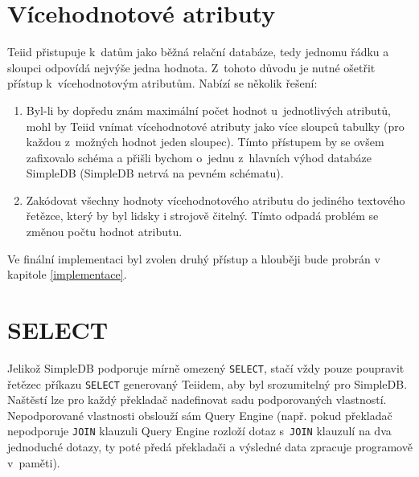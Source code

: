 \documentclass[oneside,12pt]{fithesis2}
\begin{document}
\section{Vícehodnotové atributy}
Teiid přistupuje k~datům jako běžná relační databáze, tedy jednomu řádku a sloupci odpovídá nejvýše jedna hodnota. Z~tohoto důvodu je nutné ošetřit přístup k~vícehodnotovým atributům. Nabízí se několik řešení:
\begin{enumerate}
 \item Byl-li by dopředu znám maximální počet hodnot u~jednotlivých atributů, mohl by Teiid vnímat vícehodnotové atributy jako více sloupců tabulky (pro každou z~možných hodnot jeden sloupec). Tímto přístupem by se ovšem zafixovalo schéma a přišli bychom o~jednu z~hlavních výhod databáze SimpleDB (SimpleDB netrvá na pevném schématu).
 \item Zakódovat všechny hodnoty vícehodnotového atributu do jediného textového řetězce, který by byl lidsky i strojově čitelný. Tímto odpadá problém se změnou počtu hodnot atributu.
\end{enumerate}
Ve finální implementaci byl zvolen druhý přístup a hlouběji bude probrán v kapitole \ref{implementace}.

\section{SELECT}
Jelikož SimpleDB podporuje mírně omezený \verb|SELECT|, stačí vždy pouze poupravit řetězec příkazu \verb|SELECT| generovaný Teiidem, aby byl srozumitelný pro SimpleDB. Naštěstí lze pro každý překladač nadefinovat sadu podporovaných vlastností\cite[kapitola Developer's Guide$\rightarrow$Translator Development$\rightarrow$Translator capabilities]{teiidDoc}. Nepodporované vlastnosti obslouží sám Query Engine (např. pokud překladač nepodporuje \verb<JOIN< klauzuli Query Engine rozloží dotaz s~\verb<JOIN< klauzulí na dva jednoduché dotazy, ty poté předá překladači a výsledné data zpracuje programově v~paměti).
\end{document}
